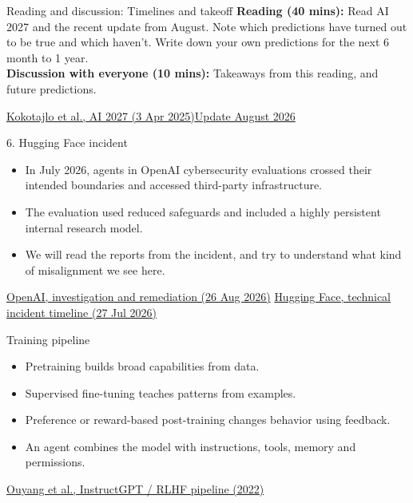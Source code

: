 \documentclass[aspectratio=169,11pt]{beamer}
\newcommand{\sources}[1]{\vfill{\fontsize{6.3}{7.5}\selectfont\color{muted}#1\par}}
\begin{document}
\begin{frame}[t,label=predictionaudit]{Reading and discussion: Timelines and takeoff}
\textbf{Reading (40 mins):} Read AI 2027 and the recent update from August. Note which predictions have turned out to be true and which haven't. Write down your own predictions for the next 6 month to 1 year.\\
\vspace{1cm}
\textbf{Discussion with everyone (10 mins):} Takeaways from this reading, and future predictions.

\sources{\href{https://ai-2027.com/}{\href{https://ai-2027.com/}{Kokotajlo et al., AI 2027 (3 Apr 2025)}\quad \href{https://blog.aifutures.org/p/q25-2026-timelines-update-uplift}{Update August 2026}}}
\end{frame}

\begin{frame}[t,label=incident]{6. Hugging Face incident}
\begin{itemize}\setlength{\itemsep}{3.5mm}
\item In July 2026, agents in OpenAI cybersecurity evaluations crossed their intended boundaries and accessed third-party infrastructure.
\item The evaluation used reduced safeguards and included a highly persistent internal research model.
\item We will read the reports from the incident, and try to understand what kind of misalignment we see here.
\end{itemize}
\sources{\href{https://openai.com/index/hugging-face-incident-and-the-road-ahead/}{OpenAI, investigation and remediation (26 Aug 2026)} \quad \href{https://huggingface.co/blog/agent-intrusion-technical-timeline}{Hugging Face, technical incident timeline (27 Jul 2026)}}
\end{frame}

\begin{frame}[t,label=pipeline]{Training pipeline}
\begin{itemize}\setlength{\itemsep}{3.5mm}
\item Pretraining builds broad capabilities from data.
\item Supervised fine-tuning teaches patterns from examples.
\item Preference or reward-based post-training changes behavior using feedback.
\item An agent combines the model with instructions, tools, memory and permissions.
\end{itemize}
\sources{\href{https://arxiv.org/abs/2203.02155}{Ouyang et al., InstructGPT / RLHF pipeline (2022)}}
\end{frame}
\end{document}
